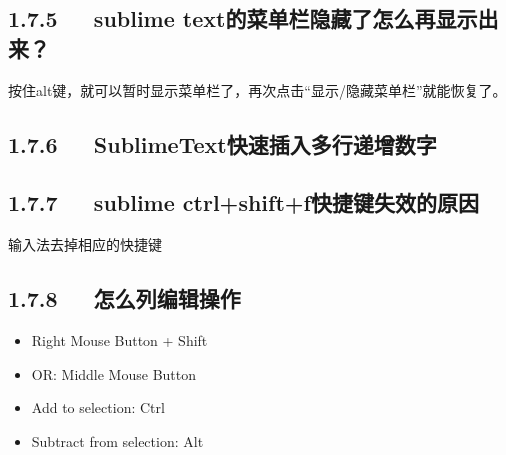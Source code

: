 \documentclass[letterpaper,12pt,english]{sphinxmanual}
\begin{document}
\subsection{1.7.5   sublime text的菜单栏隐藏了怎么再显示出来？}
\label{\detokenize{001software/001install/sublime:sublime-text}}
按住alt键，就可以暂时显示菜单栏了，再次点击“显示/隐藏菜单栏”就能恢复了。


\subsection{1.7.6   SublimeText快速插入多行递增数字}
\label{\detokenize{001software/001install/sublime:sublimetext}}



\subsection{1.7.7   sublime ctrl+shift+f快捷键失效的原因}
\label{\detokenize{001software/001install/sublime:sublime-ctrl-shift-f}}
输入法去掉相应的快捷键


\subsection{1.7.8   怎么列编辑操作}
\label{\detokenize{001software/001install/sublime:id9}}
\begin{itemize}
\item {} 
Right Mouse Button + Shift

\item {} 
OR: Middle Mouse Button

\item {} 
Add to selection: Ctrl

\item {} 
Subtract from selection: Alt

\end{itemize}
\end{document}
